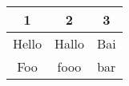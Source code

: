 \documentclass{article}
\begin{document}
	\begin{center}
	\begin{tabular}{||c c c||}
	\hline
	1 & 2 & 3\\
	\hline\hline
	Hello & Hallo & Bai\\
	Foo & fooo & bar \\
	\hline
	\end{tabular}
	\end{center}
\end{document}
